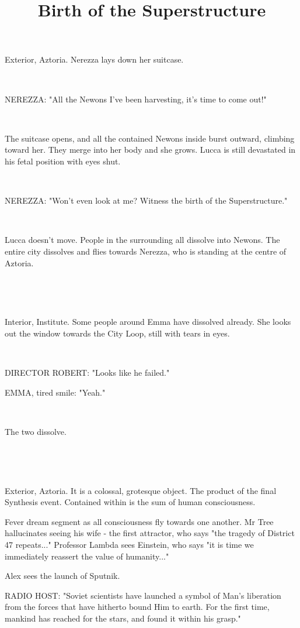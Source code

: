 \documentclass[11pt]{article}
\begin{document}
\ttfamily
\title{Birth of the Superstructure}
\maketitle


Exterior, Aztoria. 
Nerezza lays down her suitcase. 

\ 

NEREZZA: "All the Newons I've been harvesting, it's time to come out!"

\ 

The suitcase opens, and all the contained Newons inside burst outward, climbing toward her.
They merge into her body and she grows.
Lucca is still devastated in his fetal position with eyes shut.

\ 

NEREZZA: "Won't even look at me?
Witness the birth of the Superstructure."

\ 

Lucca doesn't move. 
People in the surrounding all dissolve into Newons.
The entire city dissolves and flies towards Nerezza, who is standing at the centre of Aztoria. 

\ 

\ 

Interior, Institute.
Some people around Emma have dissolved already.
She looks out the window towards the City Loop, still with tears in eyes.

\ 

DIRECTOR ROBERT: "Looks like he failed."

EMMA, tired smile: "Yeah."

\ 

The two dissolve.

\ 

\ 

Exterior, Aztoria.
It is a colossal, grotesque object.
The product of the final Synthesis event.
Contained within is the sum of human consciousness.

Fever dream segment as all consciousness fly towards one another.
Mr Tree hallucinates seeing his wife - the first attractor, who says "the tragedy of District 47 repeats..."
Professor Lambda sees Einstein, who says "it is time we immediately reassert the value of humanity..."

Alex sees the launch of Sputnik.

RADIO HOST: "Soviet scientists have launched a symbol of Man's liberation from the forces that have hitherto bound Him to earth. For the first time, mankind has reached for the stars, and found it within his grasp."
\end{document}
